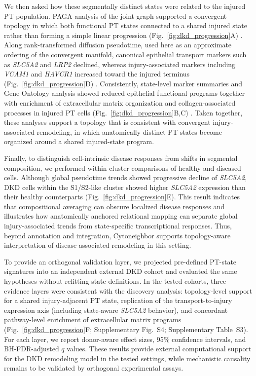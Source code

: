 \documentclass[11pt]{article}
\begin{document}
We then asked how these segmentally distinct states were related to the injured PT population. PAGA analysis of the joint graph supported a convergent topology in which both functional PT states connected to a shared injured state rather than forming a simple linear progression (Fig.~\ref{fig:dkd_progression}A) \cite{Wolf2019PAGA}. Along rank-transformed diffusion pseudotime, used here as an approximate ordering of the convergent manifold, canonical epithelial transport markers such as \textit{SLC5A2} and \textit{LRP2} declined, whereas injury-associated markers including \textit{VCAM1} and \textit{HAVCR1} increased toward the injured terminus (Fig.~\ref{fig:dkd_progression}D) \cite{Haghverdi2016DPT,Wilson2022DKD,Wu2022SGLT2iDKD}. Consistently, state-level marker summaries and Gene Ontology analysis showed reduced epithelial functional programs together with enrichment of extracellular matrix organization and collagen-associated processes in injured PT cells (Fig.~\ref{fig:dkd_progression}B,C) \cite{Kuppe2021KidneyFibrosis,Li2022KidneyFibrosisInjury,Lake2023KidneyAtlas}. Taken together, these analyses support a topology that is consistent with convergent injury-associated remodeling, in which anatomically distinct PT states become organized around a shared injured-state program.

Finally, to distinguish cell-intrinsic disease responses from shifts in segmental composition, we performed within-cluster comparisons of healthy and diseased cells. Although global pseudotime trends showed progressive decline of \textit{SLC5A2}, DKD cells within the S1/S2-like cluster showed higher \textit{SLC5A2} expression than their healthy counterparts (Fig.~\ref{fig:dkd_progression}E). This result indicates that compositional averaging can obscure localized disease responses and illustrates how anatomically anchored relational mapping can separate global injury-associated trends from state-specific transcriptional responses. Thus, beyond annotation and integration, Cytoneighbor supports topology-aware interpretation of disease-associated remodeling in this setting.

To provide an orthogonal validation layer, we projected pre-defined PT-state signatures into an independent external DKD cohort and evaluated the same hypotheses without refitting state definitions. In the tested cohorts, three evidence layers were consistent with the discovery analysis: topology-level support for a shared injury-adjacent PT state, replication of the transport-to-injury expression axis (including state-aware \textit{SLC5A2} behavior), and concordant pathway-level enrichment of extracellular matrix programs (Fig.~\ref{fig:dkd_progression}F; Supplementary Fig.~S4; Supplementary Table~S3). For each layer, we report donor-aware effect sizes, 95\% confidence intervals, and BH-FDR-adjusted $q$ values. These results provide external computational support for the DKD remodeling model in the tested settings, while mechanistic causality remains to be validated by orthogonal experimental assays.
\end{document}

